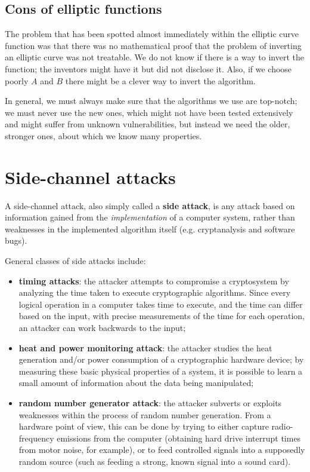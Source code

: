 
\subsection*{Cons of elliptic functions}
The problem that has been spotted almost immediately within the elliptic curve function was that there was no mathematical proof that the problem of inverting an elliptic curve was not treatable. We do not know if there is a way to invert the function; the inventors might have it but did not disclose it. Also, if we choose poorly $A$ and $B$ there might be a clever way to invert the algorithm.

In general, we must always make sure that the algorithms we use are top-notch; we must never use the new ones, which might not have been tested extensively and might suffer from unknown vulnerabilities, but instead we need the older, stronger ones, about which we know many properties.


\section{Side-channel attacks}
A side-channel attack, also simply called a \textbf{side attack}, is any attack based on information gained from the \textit{implementation} of a computer system, rather than weaknesses in the implemented algorithm itself (e.g. cryptanalysis and software bugs).

General classes of side attacks include:

\begin{itemize}
    \item \textbf{timing attacks}: the attacker attempts to compromise a cryptosystem by analyzing the time taken to execute cryptographic algorithms. Since every logical operation in a computer takes time to execute, and the time can differ based on the input, with precise measurements of the time for each operation, an attacker can work backwards to the input;
    \item \textbf{heat and power monitoring attack}: the attacker studies the heat generation and/or power consumption of a cryptographic hardware device; by measuring these basic physical properties of a system, it is possible to learn a small amount of information about the data being manipulated;
    \item \textbf{random number generator attack}: the attacker subverts or exploits weaknesses within the process of random number generation. From a hardware point of view, this can be done by trying to either capture radio-frequency emissions from the computer (obtaining hard drive interrupt times from motor noise, for example), or to feed controlled signals into a supposedly random source (such as feeding a strong, known signal into a sound card).
\end{itemize}


